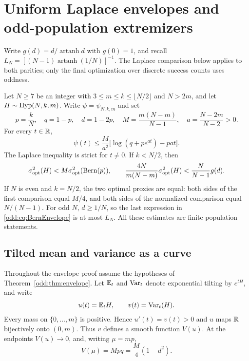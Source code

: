 \section{Uniform Laplace envelopes and odd-population extremizers}\label{sec:odd_uniform}
Write $g(d)=d/\operatorname{artanh}d$ with $g(0)=1$, and recall $L_N=[(N-1)\operatorname{artanh}(1/N)]^{-1}$. The Laplace comparison below applies to both parities; only the final optimization over discrete success counts uses oddness.

\begin{theorem}\label{odd:thm:envelope}
Let $N\ge7$ be an integer with $3\le m\le k\le\lfloor N/2\rfloor$ and $N>2m$, and let $H\sim\operatorname{Hyp}(N,k,m)$. Write $\psi=\psi_{N,k,m}$ and set
\[
 p=\frac{k}{N},\quad q=1-p,\quad d=1-2p,\quad
 M=\frac{m(N-m)}{N-1},\quad a=\frac{N-2m}{N-2}>0.
\]
For every $t\in\mathbb R$,
\begin{equation}\label{odd:eq:laplace}
 \boxed{\quad
 \psi(t)\le\frac{M}{a^2}\bigl[\log(q+pe^{at})-pat\bigr].\quad}
\end{equation}
The Laplace inequality is strict for $t\ne0$. If $k<N/2$, then
\begin{equation}\label{odd:eq:BernEnvelope}
 \sigma^2_{\rm opt}(H)<M\sigma^2_{\rm opt}(\operatorname{Bern}(p)),\qquad
 \frac{4N}{m(N-m)}\sigma^2_{\rm opt}(H)
 <\frac{N}{N-1}g(d).
\end{equation}
If $N$ is even and $k=N/2$, the two optimal proxies are equal: both sides of the first comparison equal $M/4$, and both sides of the normalized comparison equal $N/(N-1)$. For odd $N$, $d\ge 1/N$, so the last expression in \eqref{odd:eq:BernEnvelope} is at most $L_N$.
All these estimates are finite-population statements.
\end{theorem}

\subsection{Tilted mean and variance as a curve}
Throughout the envelope proof assume the hypotheses of Theorem~\ref{odd:thm:envelope}.
Let $\mathbb E_t$ and $\operatorname{Var}_t$ denote exponential tilting by $e^{tH}$, and write
\[
 u(t)=\mathbb E_tH,\qquad v(t)=\operatorname{Var}_t(H).
\]
Every mass on $\{0,\ldots,m\}$ is positive. Hence $u'(t)=v(t)>0$ and $u$ maps $\mathbb R$ bijectively onto $(0,m)$. Thus $v$ defines a smooth function $V(u)$. At the endpoints $V(u)\to0$, and, writing $\mu=mp$,
\begin{equation}\label{odd:eq:variance0}
 V(\mu)=Mpq=\frac M4(1-d^2).
\end{equation}


